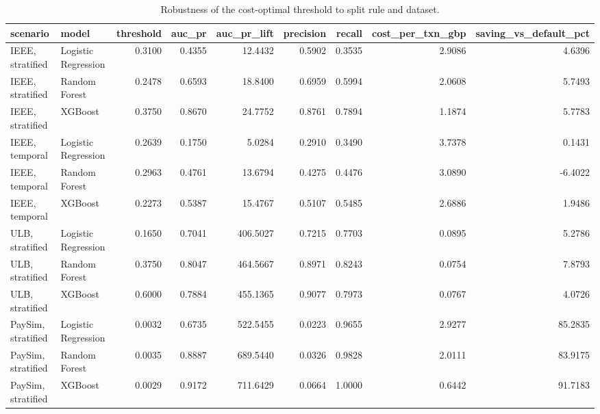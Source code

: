 \begin{table}
\caption{Robustness of the cost-optimal threshold to split rule and dataset.}
\label{tab:table3_robustness}
\begin{tabular}{llrrrrrrr}
\toprule
scenario & model & threshold & auc\_pr & auc\_pr\_lift & precision & recall & cost\_per\_txn\_gbp & saving\_vs\_default\_pct \\
\midrule
IEEE, stratified & Logistic Regression & 0.3100 & 0.4355 & 12.4432 & 0.5902 & 0.3535 & 2.9086 & 4.6396 \\
IEEE, stratified & Random Forest & 0.2478 & 0.6593 & 18.8400 & 0.6959 & 0.5994 & 2.0608 & 5.7493 \\
IEEE, stratified & XGBoost & 0.3750 & 0.8670 & 24.7752 & 0.8761 & 0.7894 & 1.1874 & 5.7783 \\
IEEE, temporal & Logistic Regression & 0.2639 & 0.1750 & 5.0284 & 0.2910 & 0.3490 & 3.7378 & 0.1431 \\
IEEE, temporal & Random Forest & 0.2963 & 0.4761 & 13.6794 & 0.4275 & 0.4476 & 3.0890 & -6.4022 \\
IEEE, temporal & XGBoost & 0.2273 & 0.5387 & 15.4767 & 0.5107 & 0.5485 & 2.6886 & 1.9486 \\
ULB, stratified & Logistic Regression & 0.1650 & 0.7041 & 406.5027 & 0.7215 & 0.7703 & 0.0895 & 5.2786 \\
ULB, stratified & Random Forest & 0.3750 & 0.8047 & 464.5667 & 0.8971 & 0.8243 & 0.0754 & 7.8793 \\
ULB, stratified & XGBoost & 0.6000 & 0.7884 & 455.1365 & 0.9077 & 0.7973 & 0.0767 & 4.0726 \\
PaySim, stratified & Logistic Regression & 0.0032 & 0.6735 & 522.5455 & 0.0223 & 0.9655 & 2.9277 & 85.2835 \\
PaySim, stratified & Random Forest & 0.0035 & 0.8887 & 689.5440 & 0.0326 & 0.9828 & 2.0111 & 83.9175 \\
PaySim, stratified & XGBoost & 0.0029 & 0.9172 & 711.6429 & 0.0664 & 1.0000 & 0.6442 & 91.7183 \\
\bottomrule
\end{tabular}
\end{table}
